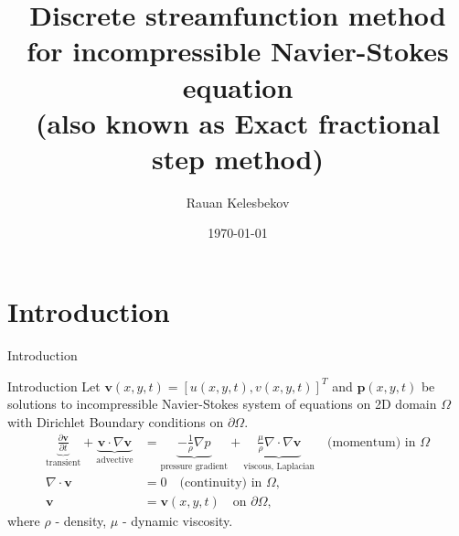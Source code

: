 \documentclass{beamer}
\title{Discrete streamfunction method for incompressible Navier-Stokes equation\\
(also known as Exact fractional step method)}
\date{\today}
\author{Rauan Kelesbekov}
\institute{University of Alberta}
\begin{document}
  \maketitle
  \section{Introduction}
  \begin{frame}{Introduction}
	\begin{figure}[H] %
	\end{figure}
	\end{frame}
  
  	\begin{frame}{Introduction}
  	Let $\boldsymbol{v}(x,y,t)=[u(x,y,t),v(x,y,t)]^T$ and $\boldsymbol{p}(x,y,t)$ be solutions to incompressible Navier-Stokes system of equations on 2D domain $\Omega$ with Dirichlet Boundary conditions on $\partial\Omega$.
	\begin{subequations}
	\label{eqs:NSE}
	\begin{align}
	\label{eqn:momentum-intro}
	\underbrace{\frac{\partial \boldsymbol{v}}{\partial t}}_{\text{transient}} 
		+ \underbrace{\boldsymbol{v} \cdot \nabla \boldsymbol{v}}_{\text{advective}} 
		&= \underbrace{-\frac{1}{\rho}\nabla p}_{\text{pressure gradient}} 
		+ \underbrace{\frac{\mu}{\rho} \nabla \cdot \nabla \boldsymbol{v}}_{\text{viscous, Laplacian}}\quad\text{(momentum) in }\Omega\\
	\label{eqn:continuity}
	\nabla \cdot \boldsymbol{v} &= 0\quad\text{(continuity) in }\Omega,\\
	\boldsymbol{v}&=\boldsymbol{v}(x,y,t)\quad\text{on }\partial\Omega,
	\end{align}
	\end{subequations}
	where $\rho$ - density, $\mu$ - dynamic viscosity.
  \end{frame}
  
\end{document}

